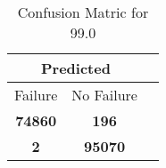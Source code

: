 \begin{table}[] 
\caption{Confusion Matric for 99.0} 
\label{Table: Prediction Accuracy-DMD99.0OnlySunEKF-ignoreReflectionEKF-top2perfectNoFailurePrediction-Reflection} 
\centering 
\begin{tabular} 
 {@{}ccc@{}} 
\toprule 
\multicolumn{2}{c}{\textbf{Predicted}}
 \\ \midrule 
\multicolumn{1}{|c|}{Failure} & 
\multicolumn{1}{c|}{No Failure}
 \\ \midrule 
\multicolumn{1}{|c|}{\color{green}\textbf{74860}} & 
\multicolumn{1}{c|}{\color{red}\textbf{196}}
 \\ \midrule 
\multicolumn{1}{|c|}{\color{red}\textbf{2}} & 
\multicolumn{1}{c|}{\color{green}\textbf{95070}}
 \\ \bottomrule 
\end{tabular} 
\end{table} 
